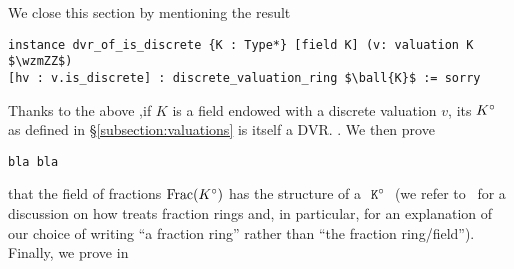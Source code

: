 \documentclass[sigplan,10pt,anonymous,review]{acmart}
\begin{document}
We close this section by mentioning the result
\begin{lstlisting}
instance dvr_of_is_discrete {K : Type*} [field K] (v: valuation K $\wzmZZ$)
[hv : v.is_discrete] : discrete_valuation_ring $\ball{K}$ := sorry
\end{lstlisting}
Thanks to the above ,if $K$ is a field endowed with a discrete valuation $v$, its  ${K}^\circ$ as defined in \S\ref{subsection:valuations} is itself a DVR. . We then prove 
\begin{lstlisting}
bla bla
\end{lstlisting}
that the field of fractions $\operatorname{Frac}({K}^\circ)$ has the structure of a $\mathtt{\ {K}^\circ\ }$ \href{https://leanprover-community.github.io/mathlib_docs/ring_theory/localization/fraction_ring.html#fraction_ring}{\extlink} (we refer to~\cite[\S4.5]{BaaDahNarNuc22} for a discussion on how \mathlib treats fraction rings and, in particular, for an explanation of our choice of writing ``a fraction ring'' rather than ``the fraction ring/field''). Finally, we prove in
\begin{lstlisting}
\end{lstlisting}
\end{document}
